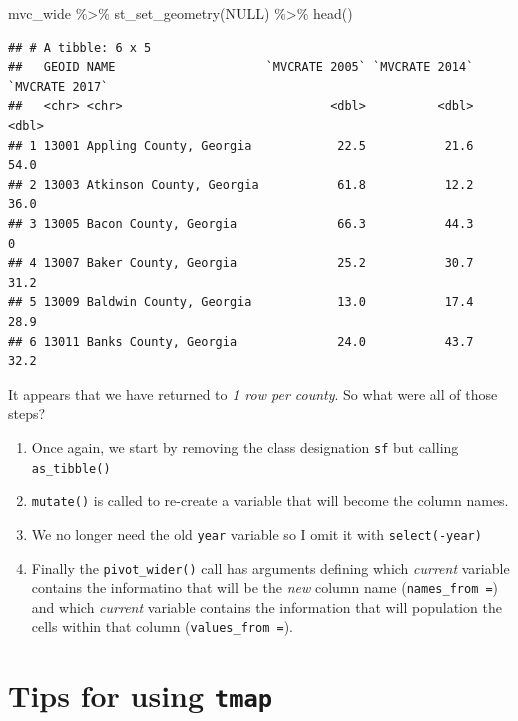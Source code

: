 \documentclass[
]{book}
\newenvironment{Shaded}{\begin{snugshade}}{\end{snugshade}}
\newcommand{\ConstantTok}[1]{\textcolor[rgb]{0.00,0.00,0.00}{#1}}
\newcommand{\FunctionTok}[1]{\textcolor[rgb]{0.00,0.00,0.00}{#1}}
\newcommand{\NormalTok}[1]{#1}
\newcommand{\SpecialCharTok}[1]{\textcolor[rgb]{0.00,0.00,0.00}{#1}}
\providecommand{\tightlist}{%
  \setlength{\itemsep}{0pt}\setlength{\parskip}{0pt}}
\begin{document}
\begin{Shaded}
\begin{Highlighting}[]
\NormalTok{mvc\_wide }\SpecialCharTok{\%\textgreater{}\%}
  \FunctionTok{st\_set\_geometry}\NormalTok{(}\ConstantTok{NULL}\NormalTok{) }\SpecialCharTok{\%\textgreater{}\%}
  \FunctionTok{head}\NormalTok{()}
\end{Highlighting}
\end{Shaded}

\begin{verbatim}
## # A tibble: 6 x 5
##   GEOID NAME                     `MVCRATE 2005` `MVCRATE 2014` `MVCRATE 2017`
##   <chr> <chr>                             <dbl>          <dbl>          <dbl>
## 1 13001 Appling County, Georgia            22.5           21.6           54.0
## 2 13003 Atkinson County, Georgia           61.8           12.2           36.0
## 3 13005 Bacon County, Georgia              66.3           44.3            0  
## 4 13007 Baker County, Georgia              25.2           30.7           31.2
## 5 13009 Baldwin County, Georgia            13.0           17.4           28.9
## 6 13011 Banks County, Georgia              24.0           43.7           32.2
\end{verbatim}

It appears that we have returned to \emph{1 row per county}. So what were all of those steps?

\begin{enumerate}
\def\labelenumi{\arabic{enumi}.}
\tightlist
\item
  Once again, we start by removing the class designation \texttt{sf} but calling \texttt{as\_tibble()}
\item
  \texttt{mutate()} is called to re-create a variable that will become the column names.
\item
  We no longer need the old \texttt{year} variable so I omit it with \texttt{select(-year)}
\item
  Finally the \texttt{pivot\_wider()} call has arguments defining which \emph{current} variable contains the informatino that will be the \emph{new} column name (\texttt{names\_from\ =}) and which \emph{current} variable contains the information that will population the cells within that column (\texttt{values\_from\ =}).
\end{enumerate}

\hypertarget{intro-tmap}{%
\chapter{\texorpdfstring{Tips for using \texttt{tmap}}{Tips for using tmap}}\label{intro-tmap}}
\end{document}

